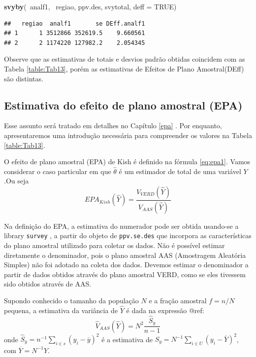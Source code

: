 \documentclass[]{book}
\newenvironment{Shaded}{\begin{snugshade}}{\end{snugshade}}
\newcommand{\KeywordTok}[1]{\textcolor[rgb]{0.13,0.29,0.53}{\textbf{{#1}}}}
\newcommand{\DataTypeTok}[1]{\textcolor[rgb]{0.13,0.29,0.53}{{#1}}}
\newcommand{\OtherTok}[1]{\textcolor[rgb]{0.56,0.35,0.01}{{#1}}}
\newcommand{\NormalTok}[1]{{#1}}
\numberwithin{example}{chapter}
\numberwithin{remark}{chapter}
\numberwithin{definition}{chapter}
\begin{document}
\begin{Shaded}
\begin{Highlighting}[]
\KeywordTok{svyby}\NormalTok{(~analf1, ~regiao, ppv.des, svytotal, }\DataTypeTok{deff =} \OtherTok{TRUE}\NormalTok{)}
\end{Highlighting}
\end{Shaded}

\begin{verbatim}
##   regiao  analf1       se DEff.analf1
## 1      1 3512866 352619.5    9.660561
## 2      2 1174220 127982.2    2.054345
\end{verbatim}

Observe que as estimativas de totais e desvios padrão obtidas coincidem
com as Tabela \ref{table:Tab13}, porém as estimativas de Efeitos de
Plano Amostral(DEff) são distintas.

\subsection{Estimativa do efeito de plano amostral
(EPA)}\label{estimativa-do-efeito-de-plano-amostral-epa}

Esse assunto será tratado em detalhes no Capítulo \ref{epa} . Por
enquanto, apresentaremos uma introdução necessária para compreender os
valores na Tabela \ref{table:Tab13}.

O efeito de plano amostral (EPA) de Kish é definido na fórmula
\eqref{eq:epa1}. Vamos considerar o caso particular em que
\(\hat{\theta}\) é um estimador de total de uma variável \(Y\).Ou seja
\[
EPA_{Kish}\left(\widehat{Y}\right)=\frac{V_{VERD}\left(\widehat{Y}\right)}{V_{AAS}\left(\widehat{Y}\right)}
\]

Na definição do EPA, a estimativa do numerador pode ser obtida usando-se
a library \texttt{survey} \citep{R-survey}, a partir do objeto de
\texttt{ppv.se.des} que incorpora as características do plano amostral
utilizado para coletar os dados. Não é possível estimar diretamente o
denominador, pois o plano amostral AAS (Amostragem Aleatória Simples)
não foi adotado na coleta dos dados. Devemos estimar o denominador a
partir de dados obtidos através do plano amostral VERD, como se eles
tivessem sido obtidos através de AAS.

Supondo conhecido o tamanho da população \(N\) e a fração amostral
\(f=n/N\) pequena, a estimativa da variância de \(\widehat{Y}\) é dada
na expressão @ref:\label{eq:estpa9} \[
\widehat{V}_{AAS}\left(\widehat{Y}\right)=N^2\frac{\widehat{S}_y}{n-1}
\] onde
\(\widehat{S}_y= n^{-1}\sum_{i\in s}\left(y_i-\overline{y}\right)^2\) é
a estimativa de
\(S_y=N^{-1}\sum_{i\in U}\left(y_i-\overline{Y}\right)^2\), com
\(\overline{Y}=N^{-1}Y\).
\end{document}
